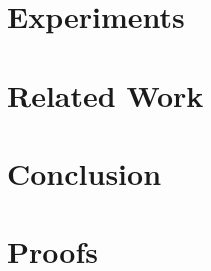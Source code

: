 \documentclass{article}
\begin{document}
\section{Experiments}
\label{sec:experiments}

\section{Related Work}

\section{Conclusion}


% 

\appendix
\section{Proofs}
\end{document}
